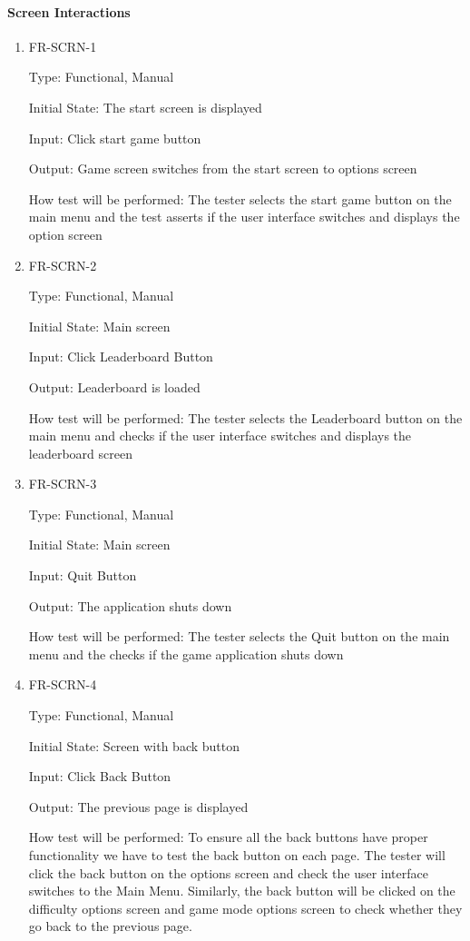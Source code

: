 \documentclass[12pt, titlepage]{article}
\begin{document}
\paragraph{Screen Interactions}
\begin{enumerate}

\item{FR-SCRN-1\\}

Type: Functional, Manual
					
Initial State: The start screen is displayed
					
Input: Click start game button
					
Output: Game screen switches from the start screen to options screen
					
How test will be performed: The tester selects the start game button on the main menu and the test asserts if the user interface switches and displays the option screen
					

\item{FR-SCRN-2\\}

Type: Functional, Manual

Initial State: Main screen

Input: Click Leaderboard Button 

Output: Leaderboard is loaded

How test will be performed: The tester selects the Leaderboard button on the main menu and checks if the user interface switches and displays the leaderboard screen

\item{FR-SCRN-3\\}

Type: Functional, Manual

Initial State: Main screen

Input: Quit Button

Output: The application shuts down 

How test will be performed: The tester selects the Quit button on the main menu and the checks if the game application shuts down

\item{FR-SCRN-4\\}

Type: Functional, Manual

Initial State: Screen with back button

Input: Click Back Button 

Output: The previous page is displayed

How test will be performed: To ensure all the back buttons have proper functionality we have to test the back button on each page. The tester will click the back button on the options screen and check the user interface switches to the Main Menu. Similarly, the back button will be clicked on the difficulty options screen and game mode options screen to check whether they go back to the previous page.
\end{enumerate}
\end{document}
